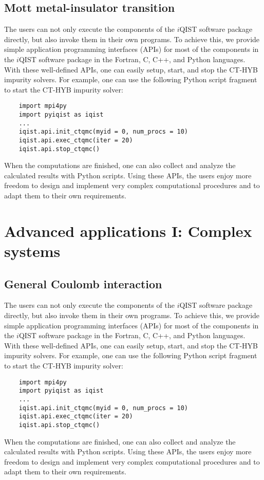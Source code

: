 \subsection{Mott metal-insulator transition}
The users can not only execute the components of the $i$QIST software package directly, but also invoke them in their own programs. To achieve this, we provide simple application programming interfaces (APIs) for most of the components in the $i$QIST software package in the Fortran, C, C++, and Python languages. With these well-defined APIs, one can easily setup, start, and stop the CT-HYB impurity solvers. For example, one can use the following Python script fragment to start the CT-HYB impurity solver:
\begin{verbatim}
    import mpi4py
    import pyiqist as iqist
    ...
    iqist.api.init_ctqmc(myid = 0, num_procs = 10)
    iqist.api.exec_ctqmc(iter = 20)
    iqist.api.stop_ctqmc()
\end{verbatim}
When the computations are finished, one can also collect and analyze the calculated results with Python scripts. Using these APIs, the users enjoy more freedom to design and implement very complex computational procedures and to adapt them to their own requirements.

\section{Advanced applications I: Complex systems}
\subsection{General Coulomb interaction}
The users can not only execute the components of the $i$QIST software package directly, but also invoke them in their own programs. To achieve this, we provide simple application programming interfaces (APIs) for most of the components in the $i$QIST software package in the Fortran, C, C++, and Python languages. With these well-defined APIs, one can easily setup, start, and stop the CT-HYB impurity solvers. For example, one can use the following Python script fragment to start the CT-HYB impurity solver:
\begin{verbatim}
    import mpi4py
    import pyiqist as iqist
    ...
    iqist.api.init_ctqmc(myid = 0, num_procs = 10)
    iqist.api.exec_ctqmc(iter = 20)
    iqist.api.stop_ctqmc()
\end{verbatim}
When the computations are finished, one can also collect and analyze the calculated results with Python scripts. Using these APIs, the users enjoy more freedom to design and implement very complex computational procedures and to adapt them to their own requirements.
